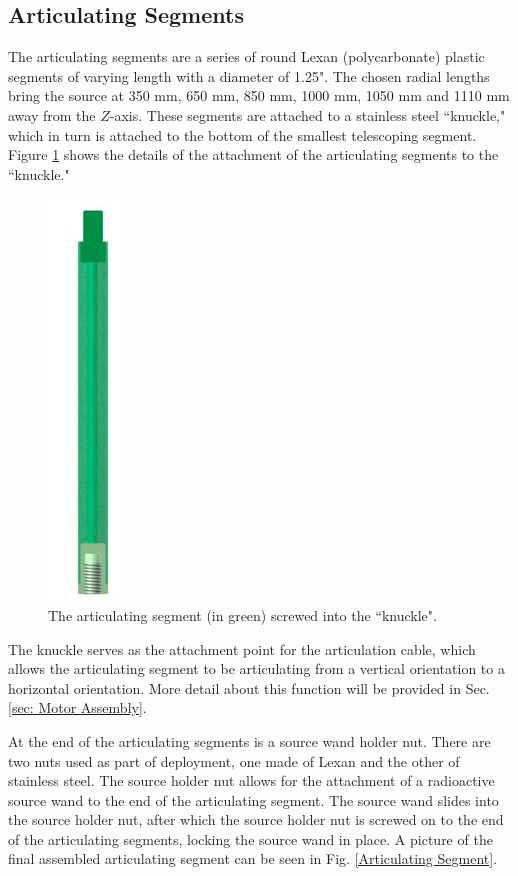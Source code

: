 \subsection{Articulating Segments}
The articulating segments are a series of round Lexan (polycarbonate) plastic segments of varying length with a diameter of 1.25". The chosen radial lengths bring the source at 350 mm, 650 mm, 850 mm, 1000 mm, 1050 mm and 1110 mm away from the $Z$-axis. These segments are attached to a stainless steel ``knuckle," which in turn is attached to the bottom of the smallest telescoping segment. Figure \ref{Knuckle_Attach} shows the details of the attachment of the articulating segments to the ``knuckle."

\begin{figure}
\includegraphics[width =.1 \textwidth]{AA/Knuckle_Attach.jpg}
\caption{The articulating segment (in green) screwed into the ``knuckle".}
\label{Knuckle_Attach}
\end{figure} 

The knuckle serves as the attachment point for the articulation cable, which allows the articulating segment to be articulating from a vertical orientation to a horizontal orientation. More detail about this function will be provided in Sec. \ref{sec: Motor Assembly}. 

At the end of the articulating segments is a source wand holder nut. There are two nuts used as part of deployment, one made of Lexan and the other of stainless steel. The source holder nut allows for the attachment of a radioactive source wand to the end of the articulating segment. The source wand slides into the source holder nut, after which the source holder nut is screwed on to the end of the articulating segments, locking the source wand in place. A picture of the final assembled articulating segment can be seen in Fig. \ref{Articulating Segment}. 

